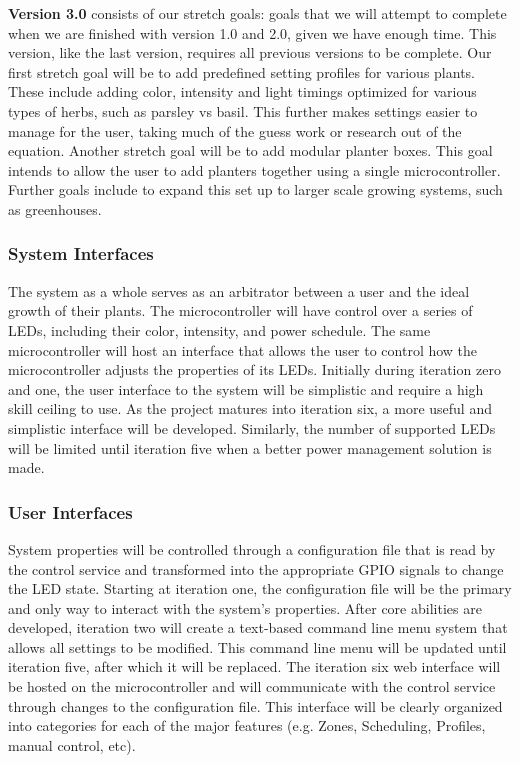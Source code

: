 \documentclass[onecolumn, draftclsnofoot,10pt, compsoc]{IEEEtran}
\begin{document}
		\noindent \textbf{Version 3.0} consists of our stretch goals: goals that we will attempt to complete when we are finished with version 1.0 and 2.0, given we have enough time. This version, like the last version,
		requires all previous versions to be complete. Our first stretch goal will be to add predefined setting profiles for various plants. These include adding color, intensity and light timings optimized
		for various types of herbs, such as parsley vs basil. This further makes settings easier to manage for the user, taking much of the guess work or research out of the equation. Another stretch goal will be
		to add modular planter boxes. This goal intends to allow the user to add planters together using a single microcontroller. Further goals include to expand this set up to larger scale growing systems,
		such as greenhouses.


		\subsubsection{System Interfaces}
				The system as a whole serves as an arbitrator between a user and the ideal growth of their plants.
				The microcontroller will have control over a series of LEDs, including their color, intensity, and power schedule. The same microcontroller will host an interface that allows the user to control
				how the microcontroller adjusts the properties of its LEDs. Initially during iteration zero and one, the user interface to the system will be simplistic and require a high skill ceiling to use. As the project matures into iteration six, a more useful and
				simplistic interface will be developed. Similarly, the number of supported LEDs will be limited until iteration five when a better power management solution is made.
		 \subsubsection{User Interfaces}
				System properties will be controlled through a configuration file that is read by the control service and transformed into the appropriate GPIO signals to change the LED state. Starting at
				iteration one, the configuration file will be the primary and only way to interact with the system's properties. After core abilities are developed, iteration two will create a text-based command
				line menu system that allows all settings to be modified. This command line menu will be updated until iteration five, after which it will be replaced.
				The iteration six web interface will be hosted on the microcontroller and will communicate with the control service through changes to the configuration file. This interface will be clearly
				organized into categories for each of the major features (e.g. Zones, Scheduling, Profiles, manual control, etc).
\end{document}
